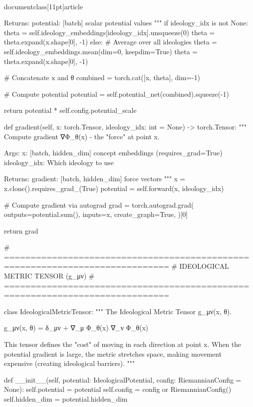 \\documentclass[11pt]{article}
\begin{document}
\begin{CodeBlock}
        Returns:
            potential: [batch] scalar potential values
        """
        if ideology_idx is not None:
            theta = self.ideology_embeddings[ideology_idx].unsqueeze(0)
            theta = theta.expand(x.shape[0], -1)
        else:
            # Average over all ideologies
            theta = self.ideology_embeddings.mean(dim=0, keepdim=True)
            theta = theta.expand(x.shape[0], -1)

        # Concatenate x and θ
        combined = torch.cat([x, theta], dim=-1)

        # Compute potential
        potential = self.potential_net(combined).squeeze(-1)

        return potential * self.config.potential_scale

    def gradient(self, x: torch.Tensor, ideology_idx: int = None) -> torch.Tensor:
        """
        Compute gradient ∇Φ_θ(x) - the "force" at point x.

        Args:
            x: [batch, hidden_dim] concept embeddings (requires_grad=True)
            ideology_idx: Which ideology to use

        Returns:
            gradient: [batch, hidden_dim] force vectors
        """
        x = x.clone().requires_grad_(True)
        potential = self.forward(x, ideology_idx)

        # Compute gradient via autograd
        grad = torch.autograd.grad(
            outputs=potential.sum(),
            inputs=x,
            create_graph=True,
        )[0]

        return grad


# =============================================================================
# IDEOLOGICAL METRIC TENSOR (g_μν)
# =============================================================================

class IdeologicalMetricTensor:
    """
    The Ideological Metric Tensor g_μν(x, θ).

    g_μν(x, θ) = δ_μν + ∇_μ Φ_θ(x) ∇_ν Φ_θ(x)

    This tensor defines the "cost" of moving in each direction at point x.
    When the potential gradient is large, the metric stretches space,
    making movement expensive (creating ideological barriers).
    """

    def __init__(self, potential: IdeologicalPotential, config: RiemannianConfig = None):
        self.potential = potential
        self.config = config or RiemannianConfig()
        self.hidden_dim = potential.hidden_dim


\end{CodeBlock}
\end{document}
